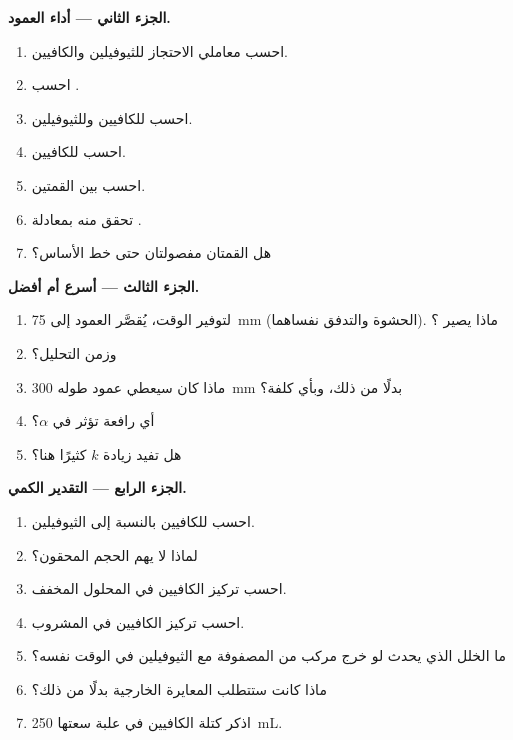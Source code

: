 \begin{problem}
\medskip
\noindent\textbf{الجزء الثاني --- أداء العمود.}
\begin{enumerate}[resume]
  \item احسب معاملي الاحتجاز للثيوفيلين والكافيين.
  \item احسب .
  \item احسب  للكافيين وللثيوفيلين.
  \item احسب  للكافيين.
  \item احسب  بين القمتين.
  \item تحقق منه بمعادلة .
  \item هل القمتان مفصولتان حتى خط الأساس؟
\end{enumerate}

\medskip
\noindent\textbf{الجزء الثالث --- أسرع أم أفضل.}
\begin{enumerate}[resume]
  \item لتوفير الوقت، يُقصَّر العمود إلى \qty{75}{mm} (الحشوة والتدفق نفساهما). ماذا يصير
        ؟
  \item وزمن التحليل؟
  \item ماذا كان سيعطي عمود طوله \qty{300}{mm} بدلًا من ذلك، وبأي كلفة؟
  \item أي رافعة تؤثر في $\alpha$؟
  \item هل تفيد زيادة $k$ كثيرًا هنا؟
\end{enumerate}

\medskip
\noindent\textbf{الجزء الرابع --- التقدير الكمي.}
\begin{enumerate}[resume]
  \item احسب  للكافيين بالنسبة إلى الثيوفيلين.
  \item لماذا لا يهم الحجم المحقون؟
  \item احسب تركيز الكافيين في المحلول المخفف.
  \item احسب تركيز الكافيين في المشروب.
  \item ما الخلل الذي يحدث لو خرج مركب من المصفوفة مع الثيوفيلين في الوقت نفسه؟
  \item ماذا كانت ستتطلب المعايرة الخارجية بدلًا من ذلك؟
  \item اذكر كتلة الكافيين في علبة سعتها \qty{250}{mL}.
\end{enumerate}
\end{problem}
